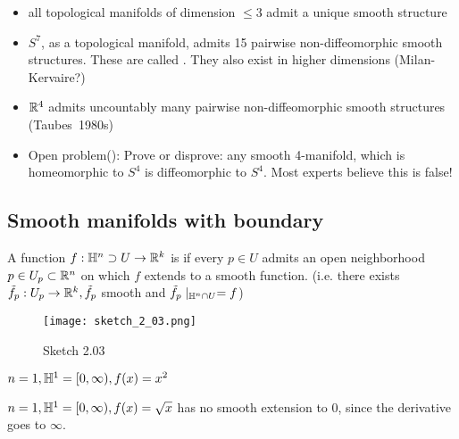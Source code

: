 \begin{remark}
    \begin{itemize}
        \item all topological manifolds of dimension \(\leq 3\) admit a unique smooth structure
        \item \(S^7\), as a topological manifold, admits 15 pairwise non-diffeomorphic smooth structures. These are called . They also exist 
            in higher dimensions (Milan-Kervaire?)
        \item \(\mathbb{R}^4\) admits uncountably many pairwise non-diffeomorphic smooth structures (Taubes~1980s)
        \item Open problem(): Prove or disprove: any smooth 
              4-manifold, which is homeomorphic to \(S^4\) is diffeomorphic to \(S^4\). Most experts believe this is false!  
    \end{itemize}
\end{remark}


\subsection{Smooth manifolds with boundary} %

\begin{definition*}
    A function \(f:\mathbb{H}^n\supset U \to \mathbb{R}^k\) is  if every \(p\in U\)
    admits an open neighborhood \(p\in U_p\subset\mathbb{R}^n\) on which \(f\) extends to a smooth function. (i.e. there exists \(\tilde{f}_p:U_p\to\mathbb{R}^k,\tilde{f}_p\) smooth and \(\tilde{f}_p\mid_{\mathbb{H}^n\cap U}=f\))
\end{definition*}

\begin{figure}[H]
    \centering
    \texttt{[image: sketch\_2\_03.png]}
    \caption{Sketch 2.03}
\end{figure}

\begin{example}
    \(n=1,\mathbb{H}^1=[0,\infty), f(x)=x^2\)
\end{example}
\begin{example}
    \(n=1,\mathbb{H}^1=[0,\infty), f(x)=\sqrt{x}\) has no smooth extension to \(0\), since the derivative goes to \(\infty\).
\end{example}


